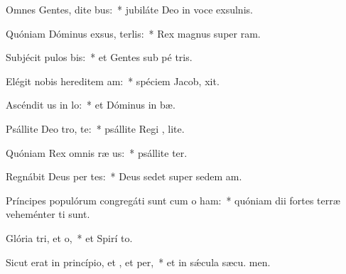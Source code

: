 \item Omnes Gentes, dite bus:~* jubiláte Deo in voce exsulnis.
\item Quóniam Dóminus exsus, terlis:~* Rex magnus super  ram.
\item Subjécit pulos bis:~* et Gentes sub pé tris.
\item Elégit nobis hereditem am:~* spéciem Jacob,  xit.
\item Ascéndit us in lo:~* et Dóminus in  bæ.
\item Psállite Deo tro, te:~* psállite Regi , lite.
\item Quóniam Rex omnis ræ us:~* psállite ter.
\item Regnábit Deus per tes:~* Deus sedet super sedem  am.
\item Príncipes populórum congregáti sunt cum o ham:~* quóniam dii fortes terræ veheménter ti sunt.
\item Glória tri, et o,~* et Spirí to.
\item Sicut erat in princípio, et , et per,~* et in sǽcula sæcu. men.
